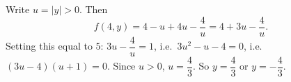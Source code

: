 Write $u=|y|>0$. Then
\[
f(4,y)=4-u+4u-\dfrac{4}{u}=4+3u-\dfrac{4}{u} .
\]
Setting this equal to $5$: $3u-\dfrac{4}{u}=1$, i.e.\ $3u^2-u-4=0$, i.e.\ $(3u-4)(u+1)=0$. Since $u>0$, $u=\dfrac{4}{3}$. So $\boxed{y=\dfrac{4}{3}\text{ or }y=-\dfrac{4}{3}}$.
